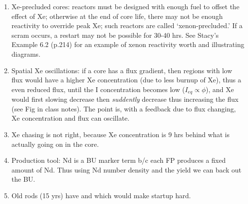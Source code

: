 \documentclass{school-22.211-notes}
\begin{document}
\begin{enumerate}
\item Xe-precluded cores: reactors must be designed with enough fuel to offset the effect of Xe; otherwise at the end of core life, there may not be enough reactivity to override peak Xe; such reactors are called `xenon-precluded.' If a scram occurs, a restart may not be possible for 30-40 hrs. See Stacy's Example 6.2 (p.214) for an example of xenon reactivity worth and illustrating diagrams. 

\item Spatial Xe oscillations: if a core has a flux gradient, then regions with low flux would have a higher Xe concentration (due to less burnup of Xe), thus a even reduced flux, until the I concentration becomes low ($I_{eq} \propto \phi$), and Xe would first slowing decrease then \textit{suddently} decrease thus increasing the flux (see Fig in class notes). The point is, with a feedback due to flux changing, Xe concentration and flux can oscillate. 

\item Xe chasing is not right, because Xe concentration is 9 hrs behind what is actually going on in the core. 

\item Production tool: Nd is a BU marker term b/c each FP produces a fixed amount of Nd. Thus using Nd number density and the yield we can back out the BU. 

\item Old rods (15 yrs) have  and  which would make startup hard. 


\end{enumerate}
\end{document}
